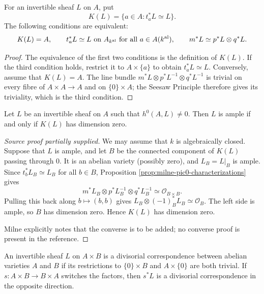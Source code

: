 \begin{proposition}
\label{prop:milne-pic0-characterizations}

For an invertible sheaf $L$ on $A$, put
\[
 K(L)=\{a\in A:t_a^*L\simeq L\}.
\]
The following conditions are equivalent:
\[
 K(L)=A,\qquad t_a^*L\simeq L\text{ on }A_{k^{\rm al}}
 \text{ for all }a\in A(k^{\rm al}),\qquad
 m^*L\simeq p^*L\otimes q^*L.
\]
\end{proposition}

\begin{proof}
The equivalence of the first two conditions is the definition of $K(L)$.  If
the third condition holds, restrict it to $A\times\{a\}$ to obtain
$t_a^*L\simeq L$.  Conversely, assume that $K(L)=A$.  The line bundle
$m^*L\otimes p^*L^{-1}\otimes q^*L^{-1}$ is trivial on every fibre of
$A\times A\to A$ and on $\{0\}\times A$; the Seesaw Principle therefore
gives its triviality, which is the third condition.
\end{proof}

\begin{proposition}
\label{prop:milne-dual-ampleness-criterion}

Let $L$ be an invertible sheaf on $A$ such that $h^0(A,L)\ne0$.  Then $L$ is
ample if and only if $K(L)$ has dimension zero.
\end{proposition}

\begin{proof}[Source proof partially supplied]
We may assume that $k$ is algebraically closed.  Suppose that $L$ is ample,
and let $B$ be the connected component of $K(L)$ passing through $0$.  It is
an abelian variety (possibly zero), and $L_B=L|_B$ is ample.  Since
$t_b^*L_B\simeq L_B$ for all $b\in B$, Proposition
\ref{prop:milne-pic0-characterizations} gives
\[
m^*L_B\otimes p^*L_B^{-1}\otimes q^*L_B^{-1}\simeq\mathcal O_{B\times B}.
\]
Pulling this back along $b\mapsto(b,b)$ gives
$L_B\otimes(-1)_B^*L_B\simeq\mathcal O_B$.  The left side is ample, so
$B$ has dimension zero.  Hence $K(L)$ has dimension zero.

Milne explicitly notes that the converse is to be added; no converse proof is
present in the reference.
\end{proof}

\begin{definition}
\label{def:milne-divisorial-correspondence}
An invertible sheaf $L$ on $A\times B$ is a divisorial correspondence between
abelian varieties $A$ and $B$ if its restrictions to
$\{0\}\times B$ and $A\times\{0\}$ are both trivial.  If
$s:A\times B\to B\times A$ switches the factors, then $s^*L$ is a
divisorial correspondence in the opposite direction.
\end{definition}

